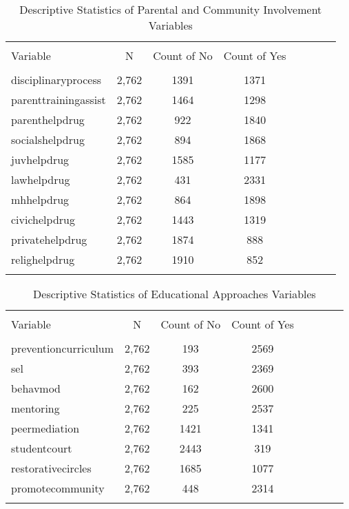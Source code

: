 \documentclass[12pt]{article}
\begin{document}
\begin{landscape}
\begin{table}[!htbp] \centering 
  \caption{Descriptive Statistics of Parental and Community Involvement Variables} 
  \label{} 
\begin{tabular}{@{\extracolsep{5pt}}lccccccc} 
\\[-1.8ex]\hline 
\hline \\[-1.8ex] 
Variable & \multicolumn{1}{c}{N} & \multicolumn{1}{c}{Count of No} & \multicolumn{1}{c}{Count of Yes} \\ 
\hline \\[-1.8ex] 
disciplinaryprocess & 2,762 & 1391 & 1371 \\ 
parenttrainingassist & 2,762 & 1464 & 1298 \\ 
parenthelpdrug & 2,762 &  922 & 1840 \\ 
socialshelpdrug & 2,762 & 894 &  1868 \\ 
juvhelpdrug & 2,762 & 1585 & 1177 \\ 
lawhelpdrug & 2,762 &  431&  2331\\ 
mhhelpdrug & 2,762 &  864 & 1898 \\ 
civichelpdrug & 2,762 &  1443 & 1319  \\ 
privatehelpdrug & 2,762 & 1874 &  888 \\ 
relighelpdrug & 2,762 & 1910 & 852 \\ 
\hline \\[-1.8ex] 
\end{tabular} 
\end{table} 

\begin{table}[!htbp] \centering 
  \caption{Descriptive Statistics of Educational Approaches Variables} 
  \label{} 
\begin{tabular}{@{\extracolsep{5pt}}lccccccc} 
\\[-1.8ex]\hline 
\hline \\[-1.8ex] 
Variable & \multicolumn{1}{c}{N} & \multicolumn{1}{c}{Count of No} & \multicolumn{1}{c}{Count of Yes} \\ 
\hline \\[-1.8ex] 
preventioncurriculum & 2,762 & 193 & 2569 \\ 
sel & 2,762 & 393 & 2369 \\ 
behavmod & 2,762 &  162 & 2600 \\ 
mentoring & 2,762 & 225 &  2537 \\ 
peermediation & 2,762 & 1421 & 1341 \\ 
studentcourt & 2,762 &  2443&  319\\ 
restorativecircles & 2,762 &  1685 & 1077 \\ 
promotecommunity & 2,762 &  448 & 2314  \\ 
\hline \\[-1.8ex] 
\end{tabular} 
\end{table} 


\end{landscape}
\end{document}
